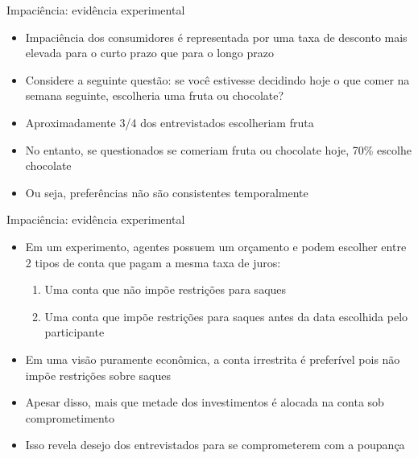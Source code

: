 \documentclass[10pt]{beamer}
\begin{document}
\begin{frame}
    {Impaciência: evidência experimental}
    \begin{itemize}
        \item Impaciência dos consumidores é representada por uma taxa de desconto mais elevada para o curto prazo que para o longo prazo\bigskip
        \item Considere a seguinte questão: se você estivesse decidindo hoje o que comer na semana seguinte, escolheria uma fruta ou chocolate?\bigskip
        \item Aproximadamente 3/4 dos entrevistados escolheriam fruta\bigskip
        \item No entanto, se questionados se comeriam fruta ou chocolate hoje, 70\% escolhe chocolate\bigskip
        \item Ou seja, preferências não são consistentes temporalmente
    \end{itemize}
\end{frame}

\begin{frame}
    {Impaciência: evidência experimental}
    \begin{itemize}
        \item Em um experimento, agentes possuem um orçamento e podem escolher entre 2 tipos de conta que pagam a mesma taxa de juros:\bigskip
        \begin{enumerate}
            \item Uma conta que não impõe restrições para saques\medskip
            \item Uma conta que impõe restrições para saques antes da data escolhida pelo participante\medskip
        \end{enumerate}
        \item Em uma visão puramente econômica, a conta irrestrita é preferível pois não impõe restrições sobre saques\bigskip
        \item Apesar disso, mais que metade dos investimentos é alocada na conta sob comprometimento\bigskip
        \item Isso revela desejo dos entrevistados para se comprometerem com a poupança
    \end{itemize}
\end{frame}
\end{document}
